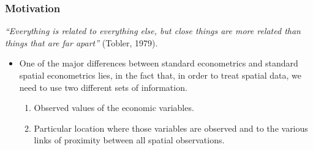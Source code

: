 \documentclass[
  shownotes,
  xcolor={svgnames},
  hyperref={colorlinks,citecolor=DarkBlue,linkcolor=DarkRed,urlcolor=DarkBlue}
  , aspectratio=169]{beamer}
\begin{document}
\begin{frame}[fragile]
\begin{minipage}[t]{0.43\linewidth}
\begin{figure}[H]
          

  \end{figure}
    \end{minipage}

\end{frame}
\begin{frame}[fragile]
\frametitle{Motivation}

 {\it “Everything is related to everything else, but close things are more related than things that are far apart”} (Tobler, 1979).

\bigskip

\begin{itemize}
  \item One of the major differences between standard econometrics and standard spatial econometrics lies, in the fact that, in order to treat spatial data, we need to use two different sets of information.
  \medskip
  \begin{enumerate}
  \item Observed values of the economic variables.
  \medskip
  \item Particular location where those variables are observed and to the various links of proximity between all spatial observations.
  \end{enumerate}
\end{itemize}

\end{frame}
\end{document}
